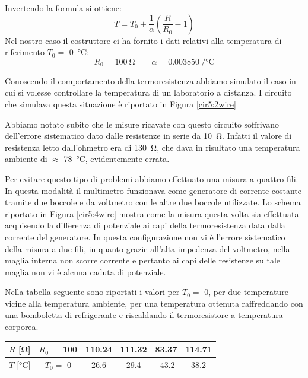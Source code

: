 Invertendo la formula si ottiene:
\begin{equation}
T = T_0 + \frac{1}{\alpha}\left( \frac{R}{R_0}-1 \right)
\end{equation}
Nel nostro caso il costruttore ci ha fornito i dati relativi alla temperatura di riferimento $T_0 =$ \SI{0}{\degreeCelsius}:
$$R_0 = \SI{100}{\ohm} \quad \quad \alpha = \SI{0.003850}{\per\degreeCelsius}$$

Conoscendo il comportamento della termoresistenza abbiamo simulato il caso in cui si volesse controllare la temperatura di un laboratorio a distanza.
I circuito che simulava questa situazione è riportato in Figura \ref{cir5:2wire}

Abbiamo notato subito che le misure ricavate con questo circuito soffrivano dell'errore sistematico dato dalle resistenze in serie da \SI{10}{\ohm}.
Infatti il valore di resistenza letto dall'ohmetro era di \SI{130}{\ohm}, che dava in risultato una temperatura ambiente di $\approx$ \SI{78}{\degreeCelsius}, evidentemente errata.

Per evitare questo tipo di problemi abbiamo effettuato una misura a quattro fili.
In questa modalità il multimetro funzionava come generatore di corrente costante tramite due boccole e da voltmetro con le altre due boccole utilizzate.
Lo schema riportato in Figura \ref{cir5:4wire} mostra come la misura questa volta sia effettuata acquisendo la differenza di potenziale ai capi della termoresistenza data dalla corrente del generatore.
In questa configurazione non vi è l'errore sistematico della misura a due fili, in quanto grazie all'alta impedenza del voltmetro, nella maglia interna non scorre corrente e pertanto ai capi delle resistenze su tale maglia non vi è alcuna caduta di potenziale.

Nella tabella seguente sono riportati i valori per $T_0 =$ 0, per due temperature vicine alla temperatura ambiente, per una temperatura ottenuta raffreddando con una bomboletta di refrigerante e riscaldando il termoresistore a temperatura corporea.

\begin{center}
{\renewcommand{\arraystretch}{1.4}%
\begin{tabular}{c|c c c c c}
$R$ [\si{\ohm}] 		& $R_0 =$ 100 	& 110.24 & 111.32 & 83.37 & 114.71\\ 
\hline 
$T$ [\si{\degreeCelsius}] 	& $T_0 =$ 0 	& 26.6 & 29.4 & -43.2 & 38.2 \\ 
\end{tabular}}
\end{center}


